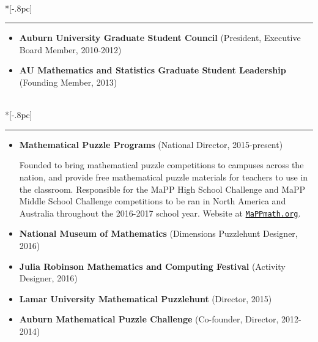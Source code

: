 \documentclass{article}
\newcommand{\headerText}[1]{
  \noindent{\large \bf #1} \\*[-.8pc]
  \rule{\textwidth}{.1pt}}
\begin{document}
\headerText{Service}
\begin{itemize}

  \item
    \textbf{Auburn University Graduate Student Council}
       (President, Executive Board Member, 2010-2012)
  \item
    \textbf{AU Mathematics and Statistics Graduate Student Leadership}
      (Founding Member, 2013)

\end{itemize}

\vfill


\headerText{Outreach}
\begin{itemize}

  \item
    \textbf{Mathematical Puzzle Programs} (National Director, 2015-present)


    Founded to bring mathematical puzzle competitions
    to campuses across the nation, and provide free mathematical puzzle
    materials for teachers to use in the classroom.
    Responsible for the MaPP High School
    Challenge and MaPP Middle School Challenge competitions to be ran
    in North America and Australia throughout the 2016-2017 school year.
    Website at
    \href{http://www.mappmath.org}{\nolinkurl{MaPPmath.org}}.

  \item
    \textbf{National Museum of Mathematics}
        (Dimensions Puzzlehunt Designer, 2016)

  \item
    \textbf{Julia Robinson Mathematics and Computing Festival}
        (Activity Designer, 2016)

  \item
    \textbf{Lamar University Mathematical Puzzlehunt} (Director, 2015)


  \item
    \textbf{Auburn Mathematical Puzzle Challenge} (Co-founder, Director, 2012-2014)



\end{itemize}
\end{document}
